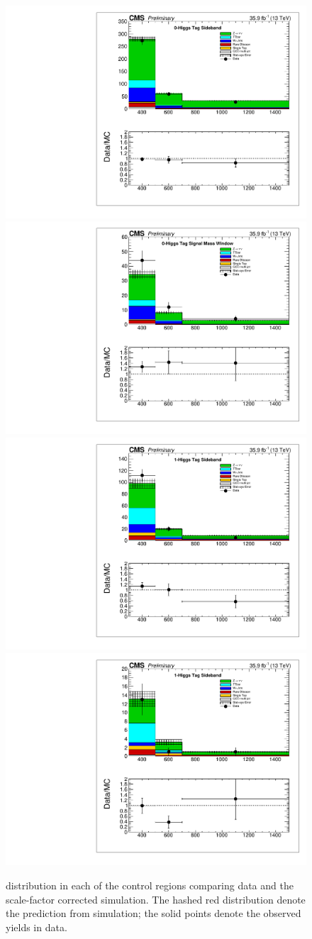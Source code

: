 \begin{figure}[hb!]
\centering
\includegraphics[trim={5px 5px 5px 5px},clip,width=0.425\linewidth]{figs/Unblinding_antitagSB.pdf}
\includegraphics[trim={5px 5px 5px 5px},clip,width=0.425\linewidth]{figs/Unblinding_antitagSR.pdf}\\
\includegraphics[trim={5px 5px 5px 5px},clip,width=0.425\linewidth]{figs/Unblinding_tagSB.pdf}
\includegraphics[trim={5px 5px 5px 5px},clip,width=0.425\linewidth]{figs/Unblinding_doubletagSB.pdf}\\
\caption{\ptmiss distribution in each of the control regions comparing data and the scale-factor corrected simulation.  The hashed red distribution denote the prediction from simulation; the solid points denote the observed yields in data.}
\label{fig:UnblindCR}
\end{figure}

